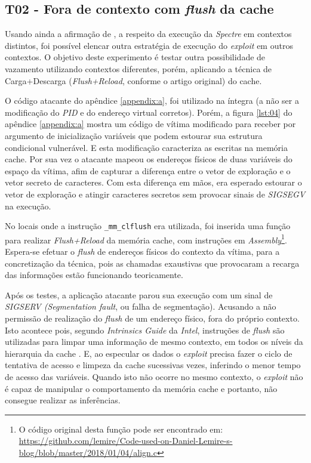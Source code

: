 \documentclass[conference]{IEEEtran}
\begin{document}
\subsection{T02 - Fora de contexto com \emph{flush} da cache}
Usando ainda a afirmação de , a respeito da execução da \emph{Spectre} em contextos distintos, foi possível elencar outra estratégia de execução do \emph{exploit} em outros contextos. O objetivo deste experimento é testar outra possibilidade de vazamento utilizando contextos diferentes, porém, aplicando a técnica de Carga+Descarga (\emph{Flush+Reload}, conforme o artigo original) do cache.

O código atacante do apêndice \ref{appendix:a}, foi utilizado na íntegra (a não ser a modificação do \emph{PID} e do endereço virtual corretos). Porém, a figura \ref{lst:04} do apêndice \ref{appendix:a} mostra um código de vítima modificado para receber por argumento de inicialização variáveis que podem estourar sua estrutura condicional vulnerável. E esta modificação caracteriza as escritas na memória cache. Por sua vez o atacante mapeou os endereços físicos de duas variáveis do espaço da vítima, afim de capturar a diferença entre o vetor de exploração e o vetor secreto de caracteres. Com esta diferença em mãos, era esperado estourar o vetor de exploração e atingir caracteres secretos sem provocar sinais de \emph{SIGSEGV} na execução.

No locais onde a instrução \lstinline[language=C, style=c]{_mm_clflush} era utilizada, foi inserida uma função para realizar \emph{Flush+Reload} da memória cache, com instruções em \emph{Assembly}\footnote{O código original desta função pode ser encontrado em: \url{https://github.com/lemire/Code-used-on-Daniel-Lemire-s-blog/blob/master/2018/01/04/align.c}}. Espera-se efetuar o \emph{flush} de endereços físicos do contexto da vítima, para a concretização da técnica, pois as chamadas exaustivas que provocaram a recarga das informações estão funcionando teoricamente.

Após os testes, a aplicação atacante parou sua execução com um sinal de \emph{SIGSERV (Segmentation fault}, ou falha de segmentação). Acusando a não permissão de realização do \emph{flush} de um endereço físico, fora do próprio contexto. Isto acontece pois, segundo \emph{Intrinsics Guide} da \emph{Intel}, instruções de \emph{flush} são utilizadas para limpar uma informação de mesmo contexto, em todos os níveis da hierarquia da cache \cite{Intel2018Intrinsics}. E, ao especular os dados o \emph{exploit} precisa fazer o ciclo de tentativa de acesso e limpeza da cache sucessivas vezes, inferindo o menor tempo de acesso das variáveis. Quando isto não ocorre no mesmo contexto, o \emph{exploit} não é capaz de manipular o comportamento da memória cache e portanto, não consegue realizar as inferências.
\end{document}
